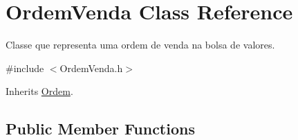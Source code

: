 \hypertarget{class_ordem_venda}{}\section{Ordem\+Venda Class Reference}
\label{class_ordem_venda}


Classe que representa uma ordem de venda na bolsa de valores.  




{\ttfamily \#include $<$Ordem\+Venda.\+h$>$}



Inherits \hyperlink{class_ordem}{Ordem}.

\subsection*{Public Member Functions}
